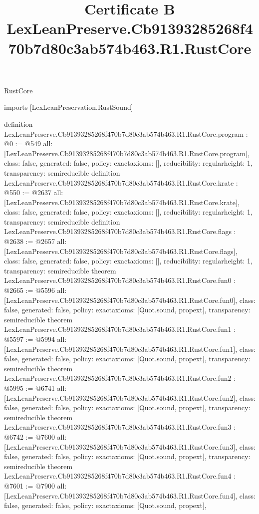 \begin{lexlean}{RustCore}
\title{Certificate B LexLeanPreserve.Cb91393285268f470b7d80c3ab574b463.R1.RustCore}
\begin{coremodule}
imports [LexLeanPreservation.RustSound]

definition LexLeanPreserve.Cb91393285268f470b7d80c3ab574b463.R1.RustCore.program : @0 := @549 {
  all: [LexLeanPreserve.Cb91393285268f470b7d80c3ab574b463.R1.RustCore.program],
  class: false,
  generated: false,
  policy: exact{axioms: []},
  reducibility: regular{height: 1},
  transparency: semireducible
}
definition LexLeanPreserve.Cb91393285268f470b7d80c3ab574b463.R1.RustCore.krate : @550 := @2637 {
  all: [LexLeanPreserve.Cb91393285268f470b7d80c3ab574b463.R1.RustCore.krate],
  class: false,
  generated: false,
  policy: exact{axioms: []},
  reducibility: regular{height: 1},
  transparency: semireducible
}
definition LexLeanPreserve.Cb91393285268f470b7d80c3ab574b463.R1.RustCore.flags : @2638 := @2657 {
  all: [LexLeanPreserve.Cb91393285268f470b7d80c3ab574b463.R1.RustCore.flags],
  class: false,
  generated: false,
  policy: exact{axioms: []},
  reducibility: regular{height: 1},
  transparency: semireducible
}
theorem LexLeanPreserve.Cb91393285268f470b7d80c3ab574b463.R1.RustCore.fun0 : @2665 := @5596 {
  all: [LexLeanPreserve.Cb91393285268f470b7d80c3ab574b463.R1.RustCore.fun0],
  class: false,
  generated: false,
  policy: exact{axioms: [Quot.sound, propext]},
  transparency: semireducible
}
theorem LexLeanPreserve.Cb91393285268f470b7d80c3ab574b463.R1.RustCore.fun1 : @5597 := @5994 {
  all: [LexLeanPreserve.Cb91393285268f470b7d80c3ab574b463.R1.RustCore.fun1],
  class: false,
  generated: false,
  policy: exact{axioms: [Quot.sound, propext]},
  transparency: semireducible
}
theorem LexLeanPreserve.Cb91393285268f470b7d80c3ab574b463.R1.RustCore.fun2 : @5995 := @6741 {
  all: [LexLeanPreserve.Cb91393285268f470b7d80c3ab574b463.R1.RustCore.fun2],
  class: false,
  generated: false,
  policy: exact{axioms: [Quot.sound, propext]},
  transparency: semireducible
}
theorem LexLeanPreserve.Cb91393285268f470b7d80c3ab574b463.R1.RustCore.fun3 : @6742 := @7600 {
  all: [LexLeanPreserve.Cb91393285268f470b7d80c3ab574b463.R1.RustCore.fun3],
  class: false,
  generated: false,
  policy: exact{axioms: [Quot.sound, propext]},
  transparency: semireducible
}
theorem LexLeanPreserve.Cb91393285268f470b7d80c3ab574b463.R1.RustCore.fun4 : @7601 := @7900 {
  all: [LexLeanPreserve.Cb91393285268f470b7d80c3ab574b463.R1.RustCore.fun4],
  class: false,
  generated: false,
  policy: exact{axioms: [Quot.sound, propext]},
}
\end{coremodule}
\end{lexlean}
